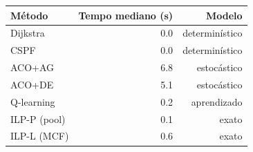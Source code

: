 \begin{tabular}{@{}lrr@{}}
\toprule
Método & Tempo mediano (s) & Modelo\\
\midrule
Dijkstra & 0.0 & determinístico\\
CSPF & 0.0 & determinístico\\
ACO+AG & 6.8 & estocástico\\
ACO+DE & 5.1 & estocástico\\
Q-learning & 0.2 & aprendizado\\
ILP-P (pool) & 0.1 & exato\\
ILP-L (MCF) & 0.6 & exato\\
\bottomrule
\end{tabular}
